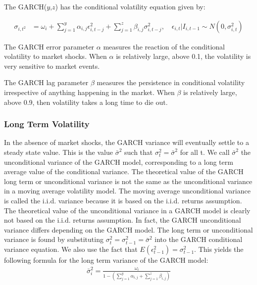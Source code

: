 The GARCH($y$,$z$) has the conditional volatility equation given by:

\begin{align}
    \sigma_{i,t^2} &= \omega_i + \sum_{j=1}^y\alpha_{i,j}\epsilon_{i,t-j}^2+\sum_{j=1}^z\beta_{i,j}\sigma_{i,t-j}^2,\quad\epsilon_{i,t} | I_{i,t-1} \sim N(0,{\sigma_{i,t}^2}) \label{ConditionalVolatilityEquation}
\end{align}

The GARCH error parameter $\alpha$ measures the reaction of the conditional volatility to market shocks. When $\alpha$ is relatively large, above 0.1, the volatility is very sensitive to market events.

The GARCH lag parameter $\beta$ measures the persistence in conditional volatility irrespective of anything happening in the market. When $\beta$ is relatively large, above 0.9, then volatility takes a long time to die out.

\subsubsection{Long Term Volatility}

In the absence of market shocks, the GARCH variance will eventually settle to a steady state value. This is the value $\bar{\sigma}^2$ such that ${\sigma_t^2} = \bar{\sigma}^2$ for all t. We call $\bar{\sigma}^2$ the unconditional variance of the GARCH model, corresponding to a long term average value of the conditional variance. The theoretical value of the GARCH long term or unconditional variance is not the same as the unconditional variance in a moving average volatility model. The moving average unconditional variance is called the i.i.d. variance because it is based on the i.i.d. returns assumption. The theoretical value of the unconditional variance in a GARCH model is clearly not based on the i.i.d. returns assumption. In fact, the GARCH unconditional variance differs depending on the GARCH model. The long term or unconditional variance is found by substituting ${\sigma_t^2} = {\sigma_{t-1}^2} = \bar{\sigma}^2$ into the GARCH conditional variance equation. We also use the fact that $E(\epsilon_{t-1}^2)=\sigma_{t-1}^2$. This yields the following formula for the long term variance of the GARCH model:
\begin{align}
    \bar{\sigma}_i^2=\frac{\omega_i}{1-(\sum_{j=1}^y\alpha_{i,j}+\sum_{j=1}^z\beta_{i,j})} \label{longTermVolatilityGARCH}
\end{align}

